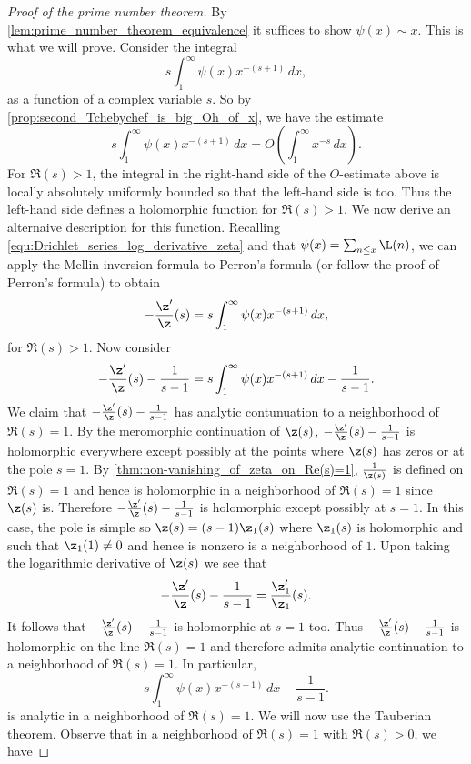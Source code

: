       \begin{proof}[Proof of the prime number theorem]
        By \cref{lem:prime_number_theorem_equivalence} it suffices to show $\psi(x) \sim x$. This is what we will prove. Consider the integral
        \[
          s\int_{1}^{\infty}\psi(x)x^{-(s+1)}\,dx,
        \]
        as a function of a complex variable $s$. So by \cref{prop:second_Tchebychef_is_big_Oh_of_x}, we have the estimate
        \[
          s\int_{1}^{\infty}\psi(x)x^{-(s+1)}\,dx = O\left(\int_{1}^{\infty}x^{-s}\,dx\right).
        \]
        For $\Re(s) > 1$, the integral in the right-hand side of the $O$-estimate above is locally absolutely uniformly bounded so that the left-hand side is too. Thus the left-hand side defines a holomorphic function for $\Re(s) > 1$. We now derive an alternaive description for this function. Recalling \cref{equ:Drichlet_series_log_derivative_zeta} and that $\psi(x) = \sum_{n \le x}\L(n)$, we can apply the Mellin inversion formula to Perron's formula (or follow the proof of Perron's formula) to obtain
        \[
          -\frac{\z'}{\z}(s) = s\int_{1}^{\infty}\psi(x)x^{-(s+1)}\,dx,
        \]
        for $\Re(s) > 1$. Now consider
        \[
          -\frac{\z'}{\z}(s)-\frac{1}{s-1} = s\int_{1}^{\infty}\psi(x)x^{-(s+1)}\,dx-\frac{1}{s-1}.
        \]
        We claim that $-\frac{\z'}{\z}(s)-\frac{1}{s-1}$ has analytic contunuation to a neighborhood of $\Re(s) = 1$. By the meromorphic continuation of $\z(s)$, $-\frac{\z'}{\z}(s)-\frac{1}{s-1}$ is holomorphic everywhere except possibly at the points where $\z(s)$ has zeros or at the pole $s = 1$. By \cref{thm:non-vanishing_of_zeta_on_Re(s)=1}, $\frac{1}{\z(s)}$ is defined on $\Re(s) = 1$ and hence is holomorphic in a neighborhood of $\Re(s) = 1$ since $\z(s)$ is. Therefore $-\frac{\z'}{\z}(s)-\frac{1}{s-1}$ is holomorphic except possibly at $s = 1$. In this case, the pole is simple so $\z(s) = (s-1)\z_{1}(s)$ where $\z_{1}(s)$ is holomorphic and such that $\z_{1}(1) \neq 0$ and hence is nonzero is a neighborhood of $1$. Upon taking the logarithmic derivative of $\z(s)$ we see that
        \[
          -\frac{\z'}{\z}(s)-\frac{1}{s-1} = \frac{\z_{1}'}{\z_{1}}(s).
        \]
        It follows that $-\frac{\z'}{\z}(s)-\frac{1}{s-1}$ is holomorphic at $s = 1$ too. Thus $-\frac{\z'}{\z}(s)-\frac{1}{s-1}$ is holomorphic on the line $\Re(s) = 1$ and therefore admits analytic continuation to a neighborhood of $\Re(s) = 1$. In particular,
        \[
          s\int_{1}^{\infty}\psi(x)x^{-(s+1)}\,dx-\frac{1}{s-1}.
        \]
        is analytic in a neighborhood of $\Re(s) = 1$. We will now use the Tauberian theorem. Observe that in a neighborhood of $\Re(s) = 1$ with $\Re(s) > 0$, we have

\end{proof}
